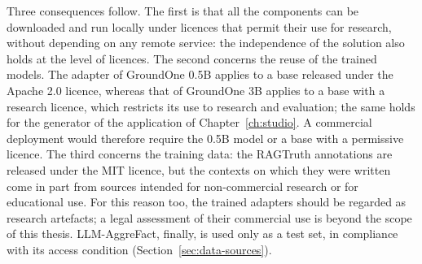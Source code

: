 Three consequences follow. The first is that all the components can be downloaded and run locally under licences that
permit their use for research, without depending on any remote service: the independence of the solution also holds at
the level of licences. The second concerns the reuse of the trained models. The adapter of GroundOne 0.5B applies to a
base released under the Apache 2.0 licence, whereas that of GroundOne 3B applies to a base with a research licence,
which restricts its use to research and evaluation; the same holds for the generator of the application of
Chapter~\ref{ch:studio}. A commercial deployment would therefore require the 0.5B model or a base with a permissive
licence. The third concerns the training data: the RAGTruth annotations are released under the MIT licence, but the
contexts on which they were written come in part from sources intended for non-commercial research or for educational
use. For this reason too, the trained adapters should be regarded as research artefacts; a legal assessment of their
commercial use is beyond the scope of this thesis. LLM-AggreFact, finally, is used only as a test set, in compliance
with its access condition (Section~\ref{sec:data-sources}).
